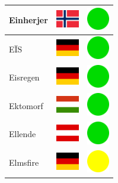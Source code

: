 \documentclass[12pt, a4paper, twoside]{report}
\begin{document}
\begin{center}
\begin{longtable}{|p{5cm}|p{2cm}|p{2cm}|}
 Einherjer                                                  & \includegraphics[width=1cm]{../4x3/no} &   \includegraphics[width=1cm]{../likes/y} \\ \hline
 EÏS                                                        & \includegraphics[width=1cm]{../4x3/de} &   \includegraphics[width=1cm]{../likes/y} \\ \hline
 Eisregen                                                   & \includegraphics[width=1cm]{../4x3/de} &   \includegraphics[width=1cm]{../likes/y} \\ \hline
 Ektomorf                                                   & \includegraphics[width=1cm]{../4x3/hu} &   \includegraphics[width=1cm]{../likes/y} \\ \hline
 Ellende                                                    & \includegraphics[width=1cm]{../4x3/at} &   \includegraphics[width=1cm]{../likes/y} \\ \hline
 Elmsfire                                                   & \includegraphics[width=1cm]{../4x3/de} &   \includegraphics[width=1cm]{../likes/m} \\ \hline

\end{longtable}
\end{center}
\end{document}
